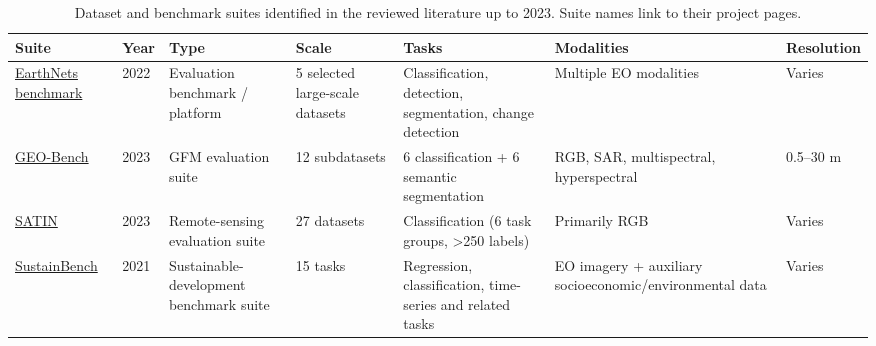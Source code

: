 \begin{table}[htbp]
\centering
\small
\setlength{\tabcolsep}{4pt}
\begin{tabular}{p{2.6cm} p{1.1cm} p{3.2cm} p{2.6cm} p{4.0cm} p{3.7cm} p{1.7cm}}
\toprule
\textbf{Suite} & \textbf{Year} & \textbf{Type} & \textbf{Scale} & \textbf{Tasks} & \textbf{Modalities} & \textbf{Resolution}\\
\midrule
\href{\detokenize{https://earthnets.github.io/}}{EarthNets benchmark} & 2022 & Evaluation benchmark / platform & 5 selected large-scale datasets & Classification, detection, segmentation, change detection & Multiple EO modalities & Varies \\
\href{\detokenize{https://github.com/ServiceNow/geo-bench}}{GEO-Bench} & 2023 & GFM evaluation suite & 12 subdatasets & 6 classification + 6 semantic segmentation & RGB, SAR, multispectral, hyperspectral & 0.5--30 m \\
\href{\detokenize{https://satinbenchmark.github.io/}}{SATIN} & 2023 & Remote-sensing evaluation suite & 27 datasets & Classification (6 task groups, >250 labels) & Primarily RGB & Varies \\
\href{\detokenize{https://sustainlab-group.github.io/sustainbench/}}{SustainBench} & 2021 & Sustainable-development benchmark suite & 15 tasks & Regression, classification, time-series and related tasks & EO imagery + auxiliary socioeconomic/environmental data & Varies \\
\bottomrule
\end{tabular}
\caption{Dataset and benchmark suites identified in the reviewed literature up to 2023. Suite names link to their project pages.}
\label{tab:dataset_suites}
\end{table}